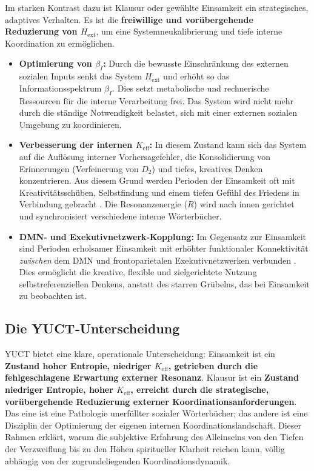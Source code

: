 \documentclass[12pt,a4paper]{article}
\begin{document}
	Im starken Kontrast dazu ist Klausur oder gewählte Einsamkeit ein strategisches, adaptives Verhalten. Es ist die \textbf{freiwillige und vorübergehende Reduzierung von \(H_{\mathrm{ext}}\)}, um eine Systemneukalibrierung und tiefe interne Koordination zu ermöglichen.
	
	\begin{itemize}
		\item \textbf{Optimierung von \(\beta_I\):} Durch die bewusste Einschränkung des externen sozialen Inputs senkt das System \(H_{\mathrm{ext}}\) und erhöht so das Informationsspektrum \(\beta_I\). Dies setzt metabolische und rechnerische Ressourcen für die interne Verarbeitung frei. Das System wird nicht mehr durch die ständige Notwendigkeit belastet, sich mit einer externen sozialen Umgebung zu koordinieren.
		\item \textbf{Verbesserung der internen \(K_{\mathrm{eff}}\):} In diesem Zustand kann sich das System auf die Auflösung interner Vorhersagefehler, die Konsolidierung von Erinnerungen (Verfeinerung von \(D_2\)) und tiefes, kreatives Denken konzentrieren. Aus diesem Grund werden Perioden der Einsamkeit oft mit Kreativitätsschüben, Selbstfindung und einem tiefen Gefühl des Friedens in Verbindung gebracht \cite{Nguyen2023}. Die Resonanzenergie (\(R\)) wird nach innen gerichtet und synchronisiert verschiedene interne Wörterbücher.
		\item \textbf{DMN‑ und Exekutivnetzwerk‑Kopplung:} Im Gegensatz zur Einsamkeit sind Perioden erholsamer Einsamkeit mit erhöhter funktionaler Konnektivität \textit{zwischen} dem DMN und frontoparietalen Exekutivnetzwerken verbunden \cite{Llera2024}. Dies ermöglicht die kreative, flexible und zielgerichtete Nutzung selbstreferenziellen Denkens, anstatt des starren Grübelns, das bei Einsamkeit zu beobachten ist.
	\end{itemize}
	
	\subsection{Die YUCT‑Unterscheidung}
	
	YUCT bietet eine klare, operationale Unterscheidung: Einsamkeit ist ein \textbf{Zustand hoher Entropie, niedriger \(K_{\mathrm{eff}}\), getrieben durch die fehlgeschlagene Erwartung externer Resonanz}. Klausur ist ein \textbf{Zustand niedriger Entropie, hoher \(K_{\mathrm{eff}}\), erreicht durch die strategische, vorübergehende Reduzierung externer Koordinationsanforderungen}. Das eine ist eine Pathologie unerfüllter sozialer Wörterbücher; das andere ist eine Disziplin der Optimierung der eigenen internen Koordinationslandschaft. Dieser Rahmen erklärt, warum die subjektive Erfahrung des Alleinseins von den Tiefen der Verzweiflung bis zu den Höhen spiritueller Klarheit reichen kann, völlig abhängig von der zugrundeliegenden Koordinationsdynamik.
	
\end{document}
